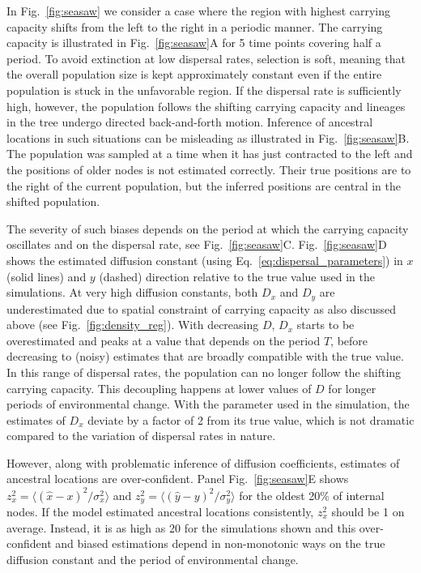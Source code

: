 \documentclass[aps,rmp, twocolumn]{revtex4}
\begin{document}
In Fig.~\ref{fig:seasaw} we consider a case where the region with highest carrying capacity shifts from the left to the right in a periodic manner.
The carrying capacity is illustrated in Fig.~\ref{fig:seasaw}A for 5 time points covering half a period.
To avoid extinction at low dispersal rates, selection is soft, meaning that the overall population size is kept approximately constant even if the entire population is stuck in the unfavorable region.
If the dispersal rate is sufficiently high, however, the population follows the shifting carrying capacity and lineages in the tree undergo directed back-and-forth motion.
Inference of ancestral locations in such situations can be misleading as illustrated in Fig.~\ref{fig:seasaw}B.
The population was sampled at a time when it has just contracted to the left and the positions of older nodes is not estimated correctly.
Their true positions are to the right of the current population, but the inferred positions are central in the shifted population.

The severity of such biases depends on the period at which the carrying capacity oscillates and on the dispersal rate, see  Fig.~\ref{fig:seasaw}C.
Fig.~\ref{fig:seasaw}D shows the estimated diffusion constant (using Eq.~\ref{eq:dispersal_parameters}) in $x$ (solid lines) and $y$ (dashed) direction relative to the true value used in the simulations.
At very high diffusion constants, both $D_x$ and $D_y$ are underestimated due to spatial constraint of carrying capacity as also discussed above (see Fig.~\ref{fig:density_reg}).
With decreasing $D$, $D_x$ starts to be overestimated and peaks at a value that depends on the period $T$, before decreasing to (noisy) estimates that are broadly compatible with the true value.
In this range of dispersal rates, the population can no longer follow the shifting carrying capacity.
This decoupling happens at lower values of $D$ for longer periods of environmental change.
With the parameter used in the simulation, the estimates of $D_x$ deviate by a factor of 2 from its true value, which is not dramatic compared to the variation of dispersal rates in nature.

However, along with problematic inference of diffusion coefficients, estimates of ancestral locations are over-confident.
Panel Fig.~\ref{fig:seasaw}E shows $z_x^2 = \langle (\hat{x} - x)^2/\sigma_x^2 \rangle$ and $z_y^2=\langle (\hat{y} - y)^2/\sigma_y^2\rangle$ for the oldest 20\% of internal nodes.
If the model estimated ancestral locations consistently, $z_x^2$ should be 1 on average.
Instead, it is as high as 20 for the simulations shown and this over-confident and biased estimations depend in non-monotonic ways on the true diffusion constant and the period of environmental change.
\end{document}
